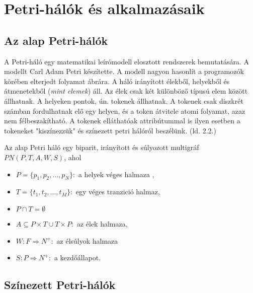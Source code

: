 \chapter{Petri-hálók és alkalmazásaik}
\section{Az alap Petri-hálók}
A Petri-háló egy matematikai leírómodell elosztott rendszerek bemutatására.
A modellt Carl Adam Petri készítette.
A modell nagyon hasonlít a programozók körében elterjedt folyamat ábrára.
A háló irányított élekből, helyekből és átmenetekből (\textsl{mint elemek}) áll.
Az élek csak két különböző típusú elem között állhatnak.
A helyeken pontok, ún. tokenek állhatnak.
A tokenek csak diszkrét számban fordulhatnak elő egy helyen, és a token átvitele atomi folyamat, azaz nem félbeszakítható.
A tokenek elláthatóak attribútummal is ilyen esetben a tokeneket "kiszínezzük" és színezett petri hálóról beszélünk. (ld. 2.2.) %

Az alap Petri háló egy biparit, irányított és súlyozott multigráf $PN(P,T,A,W,S)$, ahol 
\begin{itemize}
\item $P=\{ p_1,p_2,\ldots ,p_N \}:$ a helyek véges halmaza ,
\item $T=\{ t_1,t_2,\ldots ,t_M\}:$ egy véges tranzició halmaz,
\item $P\cap T = \emptyset$
\item $A \subseteq P\times T \cup T\times P:$ az élek halmaza,
\item $W: F\Rightarrow N^+:$ az élsúlyok halmaza
\item $S: P\Rightarrow N^+:$ a kezdőállapot.
\end{itemize}

\section{Színezett Petri-hálók}

